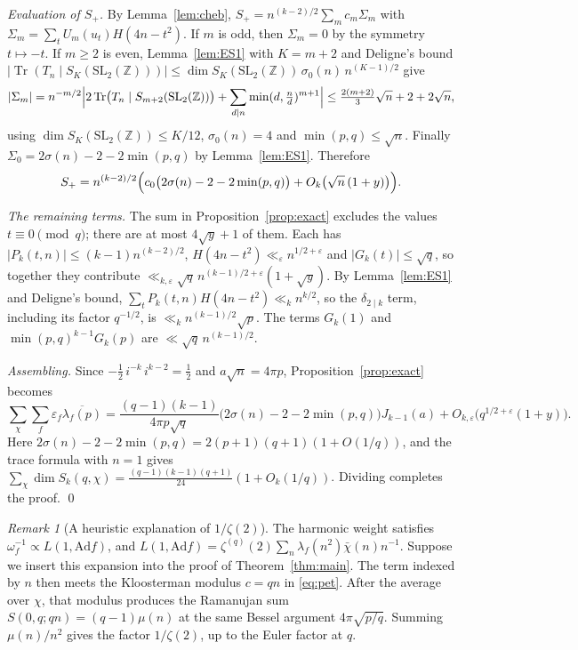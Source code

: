 \documentclass[11pt]{amsart}
\theoremstyle{remark}
\newtheorem{remark}[theorem]{Remark}
\newcommand{\eps}{\varepsilon}
\newcommand{\ov}{\overline}
\newcommand{\Tr}{\operatorname{Tr}}
\newcommand{\SL}{\mathrm{SL}_2(\mathbb Z)}
\begin{document}
\emph{Evaluation of $S_+$.} By Lemma~\ref{lem:cheb}, $S_+=n^{(k-2)/2}\sum_mc_m\Sigma_m$ with $\Sigma_m=\sum_tU_m(u_t)H(4n-t^2)$. If $m$ is odd, then $\Sigma_m=0$ by the symmetry $t\mapsto-t$. If $m\ge2$ is even, Lemma~\ref{lem:ES1} with $K=m+2$ and Deligne's bound $|\Tr(T_n\mid S_K(\SL))|\le\dim S_K(\SL)\,\sigma_0(n)\,n^{(K-1)/2}$ give
\[
|\Sigma_m|=n^{-m/2}\Bigl|2\Tr\bigl(T_n\mid S_{m+2}(\SL)\bigr)+\sum_{d\mid n}\min(d,\tfrac nd)^{m+1}\Bigr|\le\tfrac{2(m+2)}{3}\sqrt n+2+2\sqrt n,
\]
using $\dim S_K(\SL)\le K/12$, $\sigma_0(n)=4$ and $\min(p,q)\le\sqrt n$. Finally $\Sigma_0=2\sigma(n)-2-2\min(p,q)$ by Lemma~\ref{lem:ES1}. Therefore
\[
S_+=n^{(k-2)/2}\Bigl(c_0\bigl(2\sigma(n)-2-2\min(p,q)\bigr)+O_k\bigl(\sqrt n\,(1+y)\bigr)\Bigr).
\]

\emph{The remaining terms.} The sum in Proposition~\ref{prop:exact} excludes the values $t\equiv0\pmod q$; there are at most $4\sqrt y+1$ of them. Each has $|P_k(t,n)|\le(k-1)n^{(k-2)/2}$, $H(4n-t^2)\ll_\varepsilon n^{1/2+\varepsilon}$ and $|G_k(t)|\le\sqrt q$, so together they contribute $\ll_{k,\varepsilon}\sqrt q\,n^{(k-1)/2+\varepsilon}(1+\sqrt y)$. By Lemma~\ref{lem:ES1} and Deligne's bound, $\sum_tP_k(t,n)H(4n-t^2)\ll_kn^{k/2}$, so the $\delta_{2\mid k}$ term, including its factor $q^{-1/2}$, is $\ll_kn^{(k-1)/2}\sqrt p$. The terms $G_k(1)$ and $\min(p,q)^{k-1}G_k(p)$ are $\ll\sqrt q\,n^{(k-1)/2}$.

\emph{Assembling.} Since $-\tfrac12\,i^{-k}\,i^{k-2}=\tfrac12$ and $a\sqrt n=4\pi p$, Proposition~\ref{prop:exact} becomes
\[
\sum_\chi\sum_f\eps_f\ov{\lambda_f(p)}=\frac{(q-1)(k-1)}{4\pi p\sqrt q}\bigl(2\sigma(n)-2-2\min(p,q)\bigr)J_{k-1}(a)+O_{k,\varepsilon}\bigl(q^{1/2+\varepsilon}(1+y)\bigr).
\]
Here $2\sigma(n)-2-2\min(p,q)=2(p+1)(q+1)(1+O(1/q))$, and the trace formula with $n=1$ gives $\sum_\chi\dim S_k(q,\chi)=\frac{(q-1)(k-1)(q+1)}{24}(1+O_k(1/q))$. Dividing completes the proof. \qed

\begin{remark}[A heuristic explanation of $1/\zeta(2)$]\label{rem:zeta2}
The harmonic weight satisfies $\omega_f^{-1}\propto L(1,\mathrm{Ad}f)$, and $L(1,\mathrm{Ad}f)=\zeta^{(q)}(2)\sum_n\lambda_f(n^2)\bar\chi(n)n^{-1}$. Suppose we insert this expansion into the proof of Theorem~\ref{thm:main}. The term indexed by $n$ then meets the Kloosterman modulus $c=qn$ in \eqref{eq:pet}. After the average over $\chi$, that modulus produces the Ramanujan sum $S(0,q;qn)=(q-1)\mu(n)$ at the same Bessel argument $4\pi\sqrt{p/q}$. Summing $\mu(n)/n^2$ gives the factor $1/\zeta(2)$, up to the Euler factor at $q$.
\end{remark}
\end{document}
